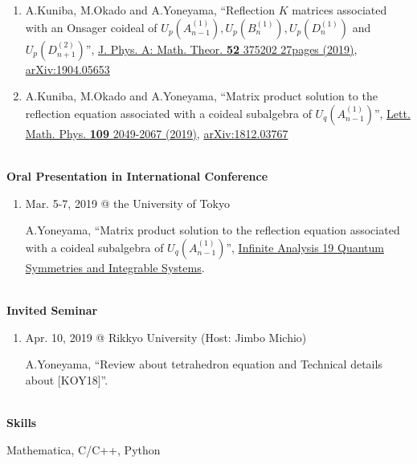 \documentclass[dvipdfmx]{jsarticle}
\begin{document}
\begin{enumerate}
\renewcommand*\theenumi{\the\numexpr\value{paperCounter}-\value{enumi}}
\setcounter{paperCounter}{3}
\item
A.Kuniba, M.Okado and A.Yoneyama, ``Reflection $K$ matrices associated with an Onsager coideal of $U_p(A_{n-1}^{(1)}),U_p(B_n^{(1)}),U_p(D_n^{(1)})$ and $U_p(D_{n+1}^{(2)})$'', \href{https://iopscience.iop.org/article/10.1088/1751-8121/ab3715}{J. Phys. A: Math. Theor. {\bf 52} 375202 27pages (2019)}, \href{https://arxiv.org/abs/1904.05653}{arXiv:1904.05653}
\item
A.Kuniba, M.Okado and A.Yoneyama, ``Matrix product solution to the reflection equation associated with a coideal subalgebra of $U_q(A_{n-1}^{(1)})$'', \href{http://links.springernature.com/f/a/VdNxbTDs8BDjk4rQBBmAjw~~/AABE5gA~/RgRekPU6P0QwaHR0cDovL3d3dy5zcHJpbmdlci5jb20vLS8wL0FXb09qTHhwT3VHTGE4WnNvSjRvVwNzcGNCCgAAusGvXDBnf-5SIHlvbmV5YW1hQGdva3V0YW4uYy51LXRva3lvLmFjLmpwWAQAAAbn}{Lett. Math. Phys. {\bf 109} 2049-2067 (2019)}, \href{https://arxiv.org/abs/1812.03767}{arXiv:1812.03767}
\end{enumerate}
%
%
%
%
{\ }\\
\vspace{3mm}
{\bf\large Oral Presentation in International Conference}
\vspace{-6mm}
\\\hrulefill
\begin{enumerate}
\item
Mar. 5-7, 2019 @ the University of Tokyo
\par
A.Yoneyama, ``Matrix product solution to the reflection equation associated with a coideal subalgebra of $U_q(A_{n-1}^{(1)})$'', \href{https://sites.google.com/view/ia19/home}{Infinite Analysis 19 Quantum Symmetries and Integrable Systems}.
\end{enumerate}
%
%
%
%
{\ }\\
\vspace{3mm}
{\bf\large Invited Seminar}
\vspace{-6mm}
\\\hrulefill
\begin{enumerate}
\item
Apr. 10, 2019 @ Rikkyo University (Host: Jimbo Michio)
\par
A.Yoneyama, ``Review about tetrahedron equation and Technical details about [KOY18]''.
\end{enumerate}
%
%
%
%
{\ }\\
\vspace{3mm}
{\bf\large Skills}
\vspace{-6mm}
\\\hrulefill
\par
Mathematica, C/C++, Python
%
%
%
%
\end{document}
